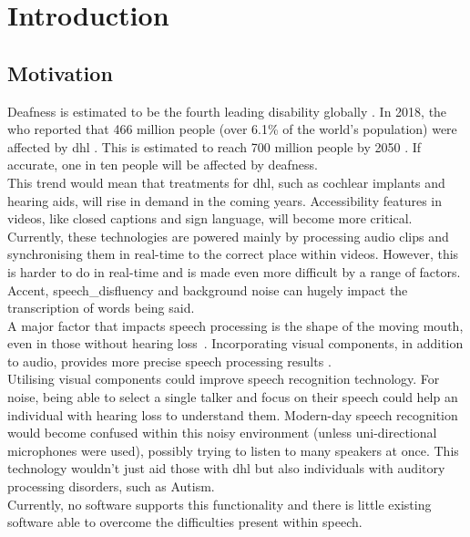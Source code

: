 \chapter{Introduction}
\label{cha:intro}


\section{Motivation}

Deafness is estimated to be the fourth leading disability globally \cite{deafness_4th_disability}. In 2018, the \acrlong{who} reported that 466 million people (over 6.1\% of the world's population) were affected by \acrfull{dhl} \cite{WHO_rising_hearing_loss}. This is estimated to reach 700 million people by 2050 \cite{WHO_deafness_stats}. If accurate, one in ten people will be affected by deafness.\\
This trend would mean that treatments for \acrshort{dhl}, such as cochlear implants and hearing aids, will rise in demand in the coming years. Accessibility features in videos, like closed captions and sign language, will become more critical. Currently, these technologies are powered mainly by processing audio clips and synchronising them in real-time to the correct place within videos. However, this is harder to do in real-time and is made even more difficult by a range of factors. Accent, \gls{speech_disfluency} and background noise can hugely impact the transcription of words being said.\\
A major factor that impacts speech processing is the shape of the moving mouth, even in those without hearing loss~\cite{lip_reading_used_by_everyone}. Incorporating visual components, in addition to audio, provides more precise speech processing results \cite{audio-visual_processing_better}.\\
Utilising visual components could improve speech recognition technology. For noise, being able to select a single talker and focus on their speech could help an individual with hearing loss to understand them. Modern-day speech recognition would become confused within this noisy environment (unless uni-directional microphones were used), possibly trying to listen to many speakers at once. This technology wouldn't just aid those with \acrshort{dhl} but also individuals with auditory processing disorders, such as Autism.\\
Currently, no software supports this functionality and there is little existing software able to overcome the difficulties present within speech.\\
